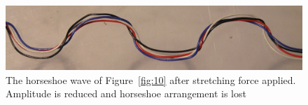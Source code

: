 %

\begin{figure}[!h]
  \centering
  \includegraphics[width=1.1\textwidth]{fig11.jpg}
  \caption{The horseshoe wave of Figure~\ref{fig:10} after stretching force applied. Amplitude is reduced and horseshoe arrangement is lost}
  \label{fig:11}
\end{figure}

%

